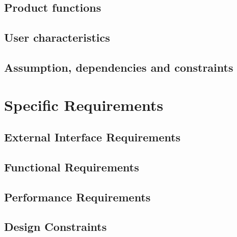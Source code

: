 \documentclass[10pt,openany]{book}
\begin{document}
		

	\section{Product functions}

		

	\section{User characteristics}

		

	\section{Assumption, dependencies and constraints}
	
		

\chapter{Specific Requirements}\label{chapt:sum}

	\section{External Interface Requirements}

		

	\section{Functional Requirements}

		

	\section{Performance Requirements}

		

	\section{Design Constraints}

		
\end{document}
